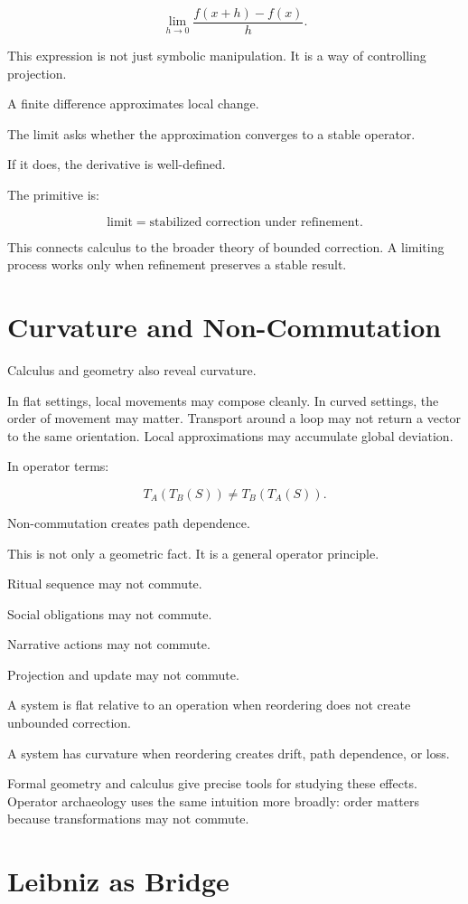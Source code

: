 \documentclass[11pt]{book}
\begin{document}
\[
\lim_{h \to 0} \frac{f(x+h)-f(x)}{h}.
\]

This expression is not just symbolic manipulation. It is a way of controlling projection.

A finite difference approximates local change.

The limit asks whether the approximation converges to a stable operator.

If it does, the derivative is well-defined.

The primitive is:

\[
\text{limit} = \text{stabilized correction under refinement}.
\]

This connects calculus to the broader theory of bounded correction. A limiting process works only when refinement preserves a stable result.

\section{Curvature and Non-Commutation}

Calculus and geometry also reveal curvature.

In flat settings, local movements may compose cleanly. In curved settings, the order of movement may matter. Transport around a loop may not return a vector to the same orientation. Local approximations may accumulate global deviation.

In operator terms:

\[
T_A(T_B(S)) \neq T_B(T_A(S)).
\]

Non-commutation creates path dependence.

This is not only a geometric fact. It is a general operator principle.

Ritual sequence may not commute.

Social obligations may not commute.

Narrative actions may not commute.

Projection and update may not commute.

A system is flat relative to an operation when reordering does not create unbounded correction.

A system has curvature when reordering creates drift, path dependence, or loss.

Formal geometry and calculus give precise tools for studying these effects. Operator archaeology uses the same intuition more broadly: order matters because transformations may not commute.

\section{Leibniz as Bridge}
\end{document}
